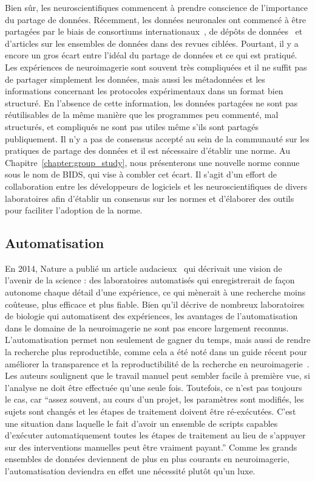 Bien sûr, les neuroscientifiques commencent à prendre conscience de l'importance du partage de données. Récemment, les données neuronales ont commencé à être partagées par le biais de consortiums internationaux~\citep{van2013wu, ollier2005uk}, de dépôts de données~\citep{poldrack2013toward, gorgolewski2015neurovault} et d'articles sur les ensembles de données dans des revues ciblées. Pourtant, il y a encore un gros écart entre  l'idéal du partage de données et ce qui est pratiqué. Les expériences de neuroimagerie sont souvent très compliquées et il ne suffit pas de partager simplement les données, mais aussi les métadonnées et les informations concernant les protocoles expérimentaux dans un format bien structuré. En l'absence de cette information, les données partagées ne sont pas réutilisables de la même manière que les programmes peu commenté, mal structurés, et compliqués ne sont pas utiles même s'ils sont partagés publiquement. Il n'y a pas de consensus accepté au sein de la communauté sur les pratiques de partage des données et il est nécessaire d'établir une norme.
Au Chapitre~\ref{chapter:group_study}, nous présenterons une nouvelle norme connue sous le nom de BIDS, qui vise à combler cet écart. Il s'agit d'un effort de collaboration entre les développeurs de logiciels et les neuroscientifiques de divers laboratoires afin d'établir un consensus sur les normes et d'élaborer des outils pour faciliter l'adoption de la norme.

\subsection*{Automatisation}
\label{sec:sommaire:automation}

En 2014, Nature a publié un article audacieux~\citep{hayden2014automated} qui décrivait une vision de l'avenir de la science : des laboratoires automatisés qui enregistrerait de façon autonome chaque détail d'une expérience, ce qui mènerait à une recherche moins coûteuse, plus efficace et plus fiable. Bien qu'il décrive de nombreux laboratoires de biologie qui automatisent des expériences, les avantages de l'automatisation dans le domaine de la neuroimagerie ne sont pas encore largement reconnus. L'automatisation permet non seulement de gagner du temps, mais aussi de rendre la recherche plus reproductible, comme cela a été noté dans un guide récent pour améliorer la transparence et la reproductibilité de la recherche en neuroimagerie~\citep{gorgolewski2016practical}. Les auteurs soulignent que le travail manuel peut sembler facile à première vue, si l'analyse ne doit être effectuée qu'une seule fois. Toutefois, ce n'est pas toujours le cas, car ``assez souvent, au cours d'un projet, les paramètres sont modifiés, les sujets sont changés et les étapes de traitement doivent être ré-exécutées. C'est une situation dans laquelle le fait d'avoir un ensemble de scripts capables d'exécuter automatiquement toutes les étapes de traitement au lieu de s'appuyer sur des interventions manuelles peut être vraiment payant.'' Comme les grands ensembles de données deviennent de plus en plus courants en neuroimagerie, l'automatisation deviendra en effet une nécessité plutôt qu'un luxe.

